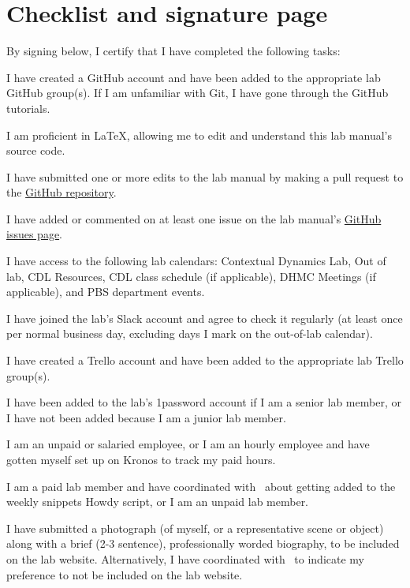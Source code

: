 \documentclass{tufte-book} %
\begin{document}
   \chapter{Checklist and signature page}
   By signing below, I certify that I have completed the following tasks:
\begin{todolist}
  \item I have created a GitHub account and have been added to the appropriate lab
    GitHub group(s).  If I am unfamiliar with Git, I have gone through
    the GitHub tutorials.
  \item I am proficient in \LaTeX, allowing me to edit and understand
  this lab manual's source code.
  \item I have submitted one or more edits to the lab manual by making a
  pull request to the
  \href{https://github.com/ContextLab/lab-manual}{GitHub repository}.
  \item I have added or commented on at least one issue on the lab manual's
\href{https://github.com/ContextLab/lab-manual/issues}{GitHub issues page}.
  \item I have access to the following lab calendars:
    Contextual Dynamics Lab, Out of lab, CDL Resources, CDL class
    schedule (if applicable), DHMC Meetings (if
    applicable), and PBS department events.
   \item I have joined the lab's Slack account and agree to check it
  regularly (at least once per normal business day, excluding days I
  mark on the out-of-lab calendar).
  \item I have created a Trello account and have been added to the appropriate lab
    Trello group(s).
  \item I have been added to the lab's 1password account if I am a
    senior lab member, or I have not been added because I am a junior
    lab member.
  \item I am an unpaid or salaried employee, or I am an hourly
    employee and have gotten myself set up on Kronos to track my paid
    hours.
  \item I am a paid lab member and have coordinated with
    \director~about getting added to the weekly snippets Howdy script,
    or I am an unpaid lab member.
  \item I have submitted a photograph (of myself, or a
    representative scene or object) along with a brief (2-3 sentence),
    professionally worded biography, to be included on the lab
    website.  Alternatively, I have coordinated with \coordinator~to indicate my
    preference to not be included on the lab website.

\end{todolist}
\end{document}
